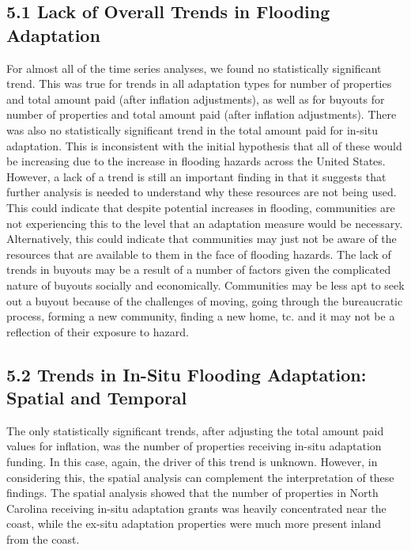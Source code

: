 \documentclass[
  12pt,
]{article}
\begin{document}
\hypertarget{lack-of-overall-trends-in-flooding-adaptation}{%
\subsection{5.1 Lack of Overall Trends in Flooding
Adaptation}\label{lack-of-overall-trends-in-flooding-adaptation}}

For almost all of the time series analyses, we found no statistically
significant trend. This was true for trends in all adaptation types for
number of properties and total amount paid (after inflation
adjustments), as well as for buyouts for number of properties and total
amount paid (after inflation adjustments). There was also no
statistically significant trend in the total amount paid for in-situ
adaptation. This is inconsistent with the initial hypothesis that all of
these would be increasing due to the increase in flooding hazards across
the United States. However, a lack of a trend is still an important
finding in that it suggests that further analysis is needed to
understand why these resources are not being used. This could indicate
that despite potential increases in flooding, communities are not
experiencing this to the level that an adaptation measure would be
necessary. Alternatively, this could indicate that communities may just
not be aware of the resources that are available to them in the face of
flooding hazards. The lack of trends in buyouts may be a result of a
number of factors given the complicated nature of buyouts socially and
economically. Communities may be less apt to seek out a buyout because
of the challenges of moving, going through the bureaucratic process,
forming a new community, finding a new home, tc. and it may not be a
reflection of their exposure to hazard.

\hypertarget{trends-in-in-situ-flooding-adaptation-spatial-and-temporal}{%
\subsection{5.2 Trends in In-Situ Flooding Adaptation: Spatial and
Temporal}\label{trends-in-in-situ-flooding-adaptation-spatial-and-temporal}}

The only statistically significant trends, after adjusting the total
amount paid values for inflation, was the number of properties receiving
in-situ adaptation funding. In this case, again, the driver of this
trend is unknown. However, in considering this, the spatial analysis can
complement the interpretation of these findings. The spatial analysis
showed that the number of properties in North Carolina receiving in-situ
adaptation grants was heavily concentrated near the coast, while the
ex-situ adaptation properties were much more present inland from the
coast.
\end{document}
